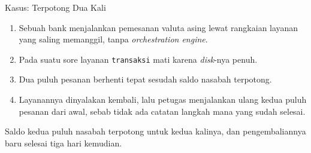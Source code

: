 \documentclass[aspectratio=169, table, 12pt]{beamer}
\begin{document}
\begin{frame}{{\Large Kasus: Terpotong Dua Kali}}
  \vspace{8pt}
  \begin{enumerate}\small
    \item Sebuah bank menjalankan pemesanan valuta asing lewat rangkaian
          layanan yang saling memanggil, tanpa \textit{orchestration engine}.
    \item Pada suatu sore layanan \texttt{transaksi} mati karena
          \textit{disk}-nya penuh.
    \item Dua puluh pesanan berhenti tepat sesudah saldo nasabah terpotong.
    \item Layanannya dinyalakan kembali, lalu petugas menjalankan ulang kedua
          puluh pesanan dari awal, sebab tidak ada catatan langkah mana yang
          sudah selesai.
  \end{enumerate}

  \vspace{8pt}
  {\small Saldo kedua puluh nasabah terpotong untuk kedua kalinya, dan
  pengembaliannya baru selesai tiga hari kemudian.}
\end{frame}
\end{document}
